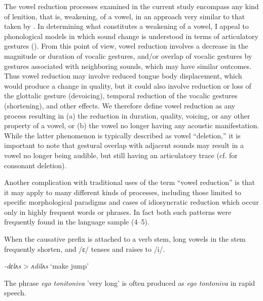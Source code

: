   The vowel reduction processes examined in the current study encompass any kind of lenition, that is, weakening, of a vowel, in an approach very similar to that taken by \citet{KapatsinskiEtAl2019}. In determining what constitutes a weakening of a vowel, I appeal to phonological models in which sound change is understood in terms of articulatory gestures (\citealt{BrowmanGoldstein1992b,MowreyPagliuca1995}). From this point of view, vowel reduction involves a decrease in the magnitude or duration of vocalic gestures, and/or overlap of vocalic gestures by gestures associated with neighboring sounds, which may have similar outcomes. Thus vowel reduction may involve reduced tongue body displacement, which would produce a change in quality, but it could also involve reduction or loss of the glottalic gesture (devoicing), temporal reduction of the vocalic gestures (shortening), and other effects. We therefore define vowel reduction as any process resulting in 
  (a) the reduction in duration, quality, voicing, or any other property of a vowel, or 
  (b) the vowel no longer having any acoustic manifestation. While the latter phenomenon is typically described as vowel ``deletion,'' it is important to note that gestural overlap with adjacent sounds may result in a vowel no longer being audible, but still having an articulatory trace (cf. \citealt{BrowmanGoldstein1990} for consonant deletion).

  Another complication with traditional uses of the term ``vowel reduction'' is that it may apply to many different kinds of processes, including those limited to specific morphological paradigms and cases of idiosyncratic reduction which occur only in highly frequent words or phrases. In fact both such patterns were frequently found in the language sample (4--5).

\ea\label{ex:6.4}

When the causative prefix is attached to a verb stem, long vowels in the stem frequently shorten, and /ɛ/ tenses and raises to /i/.

\textit{-dɛlʌs} > \textit{ʌdilʌs} ‘make jump’
\citep[1030]{Anderson1997}
\z

\ea\label{ex:6.5}

The phrase \textit{ego tonitoniva} ’very long’ is often produced as \textit{ego tontoniva} in rapid speech.
\citep[7]{Dutton1996}
\z


